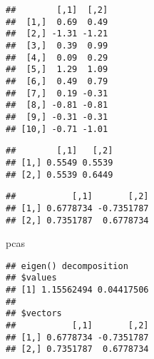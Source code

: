 \documentclass[]{article}
\newenvironment{Shaded}{\begin{snugshade}}{\end{snugshade}}
\newcommand{\KeywordTok}[1]{\textcolor[rgb]{0.13,0.29,0.53}{\textbf{#1}}}
\newcommand{\DecValTok}[1]{\textcolor[rgb]{0.00,0.00,0.81}{#1}}
\newcommand{\StringTok}[1]{\textcolor[rgb]{0.31,0.60,0.02}{#1}}
\newcommand{\CommentTok}[1]{\textcolor[rgb]{0.56,0.35,0.01}{\textit{#1}}}
\newcommand{\OperatorTok}[1]{\textcolor[rgb]{0.81,0.36,0.00}{\textbf{#1}}}
\newcommand{\NormalTok}[1]{#1}
\begin{document}
\begin{verbatim}
##        [,1]  [,2]
##  [1,]  0.69  0.49
##  [2,] -1.31 -1.21
##  [3,]  0.39  0.99
##  [4,]  0.09  0.29
##  [5,]  1.29  1.09
##  [6,]  0.49  0.79
##  [7,]  0.19 -0.31
##  [8,] -0.81 -0.81
##  [9,] -0.31 -0.31
## [10,] -0.71 -1.01
\end{verbatim}

\begin{Shaded}
\end{Shaded}

\begin{verbatim}
##        [,1]   [,2]
## [1,] 0.5549 0.5539
## [2,] 0.5539 0.6449
\end{verbatim}

\begin{Shaded}
\end{Shaded}

\begin{verbatim}
##           [,1]       [,2]
## [1,] 0.6778734 -0.7351787
## [2,] 0.7351787  0.6778734
\end{verbatim}

\begin{Shaded}
\begin{Highlighting}[]
\NormalTok{pcas}
\end{Highlighting}
\end{Shaded}

\begin{verbatim}
## eigen() decomposition
## $values
## [1] 1.15562494 0.04417506
## 
## $vectors
##           [,1]       [,2]
## [1,] 0.6778734 -0.7351787
## [2,] 0.7351787  0.6778734
\end{verbatim}
\end{document}
